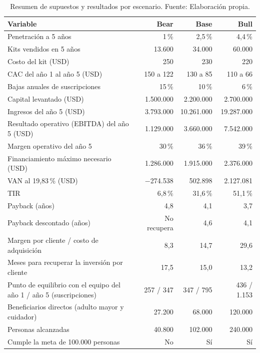 \begin{table}[H]
\centering
\caption[Resumen de supuestos y resultados por escenario.]{Resumen de supuestos y resultados por escenario. Fuente: Elaboración propia.}
\label{tab:resumen}
\begin{tabular}{|p{6.4cm}|r|r|r|}
\hline
\textbf{Variable} & \textbf{Bear} & \textbf{Base} & \textbf{Bull} \\
\hline
Penetración a 5 años & 1\,\% & 2,5\,\% & 4,4\,\% \\
\hline
Kits vendidos en 5 años & 13.600 & 34.000 & 60.000 \\
\hline
Costo del kit (USD) & 250 & 230 & 220 \\
\hline
CAC del año 1 al año 5 (USD) & 150 a 122 & 130 a 85 & 110 a 66 \\
\hline
Bajas anuales de suscripciones & 15\,\% & 10\,\% & 6\,\% \\
\hline
Capital levantado (USD) & 1.500.000 & 2.200.000 & 2.700.000 \\
\hline
Ingresos del año 5 (USD) & 3.793.000 & 10.261.000 & 19.287.000 \\
\hline
Resultado operativo (EBITDA) del año 5 (USD) & 1.129.000 & 3.660.000 & 7.542.000 \\
\hline
Margen operativo del año 5 & 30\,\% & 36\,\% & 39\,\% \\
\hline
Financiamiento máximo necesario (USD) & 1.286.000 & 1.915.000 & 2.376.000 \\
\hline
VAN al 19,83\,\% (USD) & $-$274.538 & 502.898 & 2.127.081 \\
\hline
TIR & 6,8\,\% & 31,6\,\% & 51,1\,\% \\
\hline
Payback (años) & 4,8 & 4,1 & 3,7 \\
\hline
Payback descontado (años) & No recupera & 4,6 & 4,1 \\
\hline
Margen por cliente / costo de adquisición & 8,3 & 14,7 & 29,6 \\
\hline
Meses para recuperar la inversión por cliente & 17,5 & 15,0 & 13,2 \\
\hline
Punto de equilibrio con el equipo del año 1 / año 5 (suscripciones) & 257 / 347 & 347 / 795 & 436 / 1.153 \\
\hline
Beneficiarios directos (adulto mayor y cuidador) & 27.200 & 68.000 & 120.000 \\
\hline
Personas alcanzadas & 40.800 & 102.000 & 240.000 \\
\hline
Cumple la meta de 100.000 personas & No & Sí & Sí \\
\hline
\end{tabular}
\end{table}


